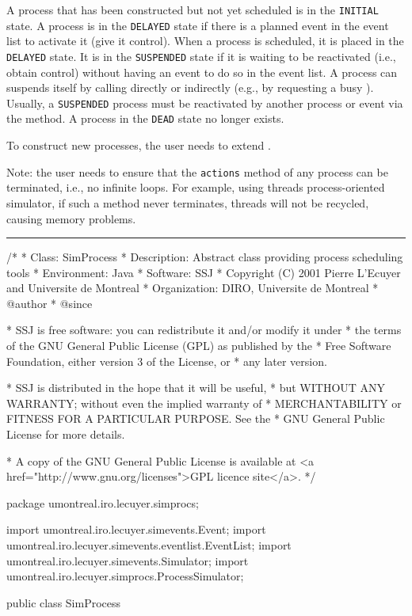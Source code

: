 A process that has been constructed but not yet scheduled is in
the \texttt{INITIAL} state.
A process is in the \texttt{DELAYED} state if there is a planned event
in the event list to activate it (give it control).
When a process is scheduled, it is placed in the \texttt{DELAYED} state.
It is in the \texttt{SUSPENDED} state if it is waiting to be reactivated
(i.e., obtain control) without having an event to do so in the event list.
A process can suspends itself by calling  directly or
indirectly (e.g., by requesting a busy ).
Usually, a \texttt{SUSPENDED} process must be reactivated by another process
or event via the  method.
A process in the \texttt{DEAD} state no longer exists.

To construct new processes, the user needs to extend .

Note: the user needs to ensure that the \texttt{actions}
method of any process can be terminated, i.e., no infinite loops.
For example, using threads process-oriented simulator,
if such a method never terminates, threads will not be recycled,
causing memory problems.

\bigskip\hrule

\begin{code}
\begin{hide}
/*
 * Class:        SimProcess
 * Description:  Abstract class providing process scheduling tools
 * Environment:  Java
 * Software:     SSJ 
 * Copyright (C) 2001  Pierre L'Ecuyer and Universite de Montreal
 * Organization: DIRO, Universite de Montreal
 * @author       
 * @since

 * SSJ is free software: you can redistribute it and/or modify it under
 * the terms of the GNU General Public License (GPL) as published by the
 * Free Software Foundation, either version 3 of the License, or
 * any later version.

 * SSJ is distributed in the hope that it will be useful,
 * but WITHOUT ANY WARRANTY; without even the implied warranty of
 * MERCHANTABILITY or FITNESS FOR A PARTICULAR PURPOSE.  See the
 * GNU General Public License for more details.

 * A copy of the GNU General Public License is available at
   <a href="http://www.gnu.org/licenses">GPL licence site</a>.
 */
\end{hide}
package umontreal.iro.lecuyer.simprocs;\begin{hide}

import umontreal.iro.lecuyer.simevents.Event;
import umontreal.iro.lecuyer.simevents.eventlist.EventList;
import umontreal.iro.lecuyer.simevents.Simulator;
import umontreal.iro.lecuyer.simprocs.ProcessSimulator;\end{hide}

public class SimProcess \begin{hide} {
\end{hide}
\end{code}
